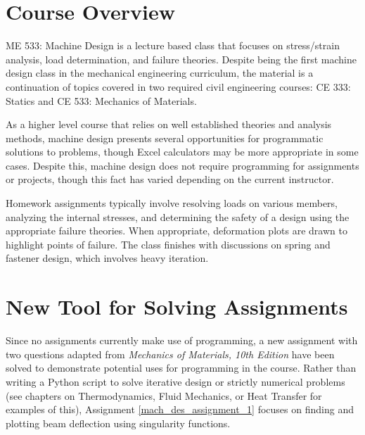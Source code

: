 \section{Course Overview}

ME 533: Machine Design is a lecture based class that focuses on stress/strain analysis, load determination,
and failure theories. Despite being the first machine design class in the mechanical engineering curriculum, 
the material is a continuation of topics covered in two required civil engineering courses: CE 333: Statics
and CE 533: Mechanics of Materials.

As a higher level course that relies on well established theories and analysis methods, machine design
presents several opportunities for programmatic solutions to problems, though Excel calculators may
be more appropriate in some cases. Despite this, machine design does not require programming for 
assignments or projects, though this fact has varied depending on the current instructor. 

Homework assignments typically involve resolving loads on various members, analyzing the internal stresses, and 
determining the safety of a design using the appropriate failure theories. When appropriate, deformation
plots are drawn to highlight points of failure. The class finishes with discussions on spring and fastener
design, which involves heavy iteration.

\section{New Tool for Solving Assignments}

Since no assignments currently make use of programming, a new assignment with two questions adapted from 
\textit{Mechanics of Materials, 10th Edition} \cite{mechanics-of-materials} have been solved 
to demonstrate potential uses for programming in the course. Rather than writing a Python script to solve 
iterative design or strictly numerical problems (see chapters on Thermodynamics, Fluid Mechanics, or 
Heat Transfer for examples of this), Assignment \ref{mach_des_assignment_1} focuses on finding and plotting 
beam deflection using singularity functions. 

\label{mach_des_assignment_1}

